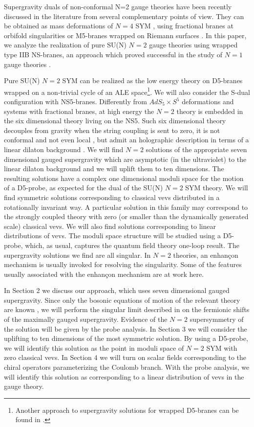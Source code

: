 \documentclass[a4paper,12pt]{article}
\begin{document}
Supergravity duals of non-conformal
N=2 gauge theories have been recently discussed in the literature from 
several complementary points of view. They can be obtained as mass deformations
of $N=4$ SYM \cite{pw,sfetsos,bpp,michela}, using fractional branes
at orbifold singularities \cite{kn,pg,bertolini,pproc,a,russo,billo}
or M5-branes wrapped on Riemann surfaces \cite{fayya}.
In this paper, we analyze the realization of pure SU(N) $N=2$
gauge theories using  wrapped type IIB NS-branes, an approach which
proved successful in the study of $N=1$ gauge theories \cite{mn1,mn2}.

Pure SU(N) $N=2$ SYM can be realized as the low energy theory
on D5-branes wrapped on
a non-trivial cycle of an ALE space\footnote{Another approach to
supergravity solutions for wrapped D5-branes can be found in
\cite{rajaraman}.}. We will also consider the
S-dual configuration with NS5-branes. 
Differently from $AdS_5\times S^5$
deformations and systems with fractional branes, at high energy
the $N=2$ theory is embedded in the six dimensional theory living
on the NS5. Such six dimensional theory decouples from gravity 
when the string coupling
is sent to zero, it is not conformal and not even
local \cite{seiberg}, but admit an holographic description in terms
of a linear dilaton background \cite{little}. 
We will find $N=2$ solutions of
the appropriate seven dimensional gauged supergravity 
which are asymptotic (in the ultraviolet)
to the linear dilaton background and we will uplift them 
to ten dimensions. 
The resulting solutions have a complex one dimensional
moduli space for the motion of a D5-probe, as expected for the dual
of the SU(N) $N=2$ SYM theory. We will find symmetric 
solutions corresponding to classical vevs
distributed in a rotationally invariant way. A particular solution in this
family may correspond to the strongly coupled theory with zero
(or smaller than the dynamically generated scale) classical vevs.
We will also find solutions corresponding to linear distributions 
of vevs. 
The moduli space structure
will be studied using a D5-probe, which, as usual, captures the 
quantum field theory one-loop result. 
The supergravity solutions we find are all singular.
In $N=2$ theories, an enhan\c con mechanism 
\cite{jpp} is usually invoked for resolving the singularity.
Some of the 
 features usually associated with the enhan\c con mechanism are 
at work here.    

In Section 2 we discuss our approach, which uses seven dimensional gauged 
supergravity. Since only the bosonic equations of motion of the
relevant theory are known \cite{cve1}, we will perform the singular
limit described in \cite{cve2} on the fermionic shifts of the
maximally gauged supergravity. Evidence
of the $N=2$ 
supersymmetry of the solution will be given by the probe analysis.
In Section 3 we will consider the uplifting to ten dimensions of
the most symmetric solution. By using a D5-probe, we will identify 
this solution as the point in moduli space
of $N=2$ SYM with zero classical vevs. 
In Section 4 we will turn on scalar fields
corresponding to the chiral operators parameterizing the
Coulomb branch. With
the probe analysis, we will identify this solution as corresponding 
to a linear distribution of vevs in the gauge theory.
\end{document}
